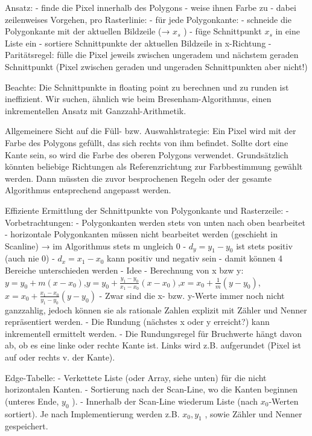 \documentclass[10pt,landscape]{article}
\makeatletter
\renewcommand{\subsection}{\@startsection{subsection}{2}{0mm}%
                                {-1explus -.5ex minus -.2ex}%
                                {0.5ex plus .2ex}%
                                {\normalfont\normalsize\bfseries}}
\makeatother
\begin{document}
\begin{multicols}{3}
Ansatz:
- finde die Pixel innerhalb des Polygons
- weise ihnen Farbe zu
- dabei zeilenweises Vorgehen, pro Rasterlinie:
- für jede Polygonkante:
  - schneide die Polygonkante mit der aktuellen Bildzeile (→ $x_s$ )
  - füge Schnittpunkt $x_s$ in eine Liste ein
- sortiere Schnittpunkte der aktuellen Bildzeile in x-Richtung
- Paritätsregel: fülle die Pixel jeweils zwischen ungeradem und nächstem geraden Schnittpunkt (Pixel zwischen geraden und ungeraden Schnittpunkten aber nicht!)

Beachte: Die Schnittpunkte in floating point zu berechnen und zu runden ist ineffizient. Wir suchen, ähnlich wie beim Bresenham-Algorithmus, einen inkrementellen Ansatz mit Ganzzahl-Arithmetik.

Allgemeinere Sicht auf die Füll- bzw. Auswahlstrategie: Ein Pixel wird mit der Farbe des Polygons gefüllt, das sich rechts von ihm befindet. Sollte dort eine Kante sein, so wird die Farbe des oberen Polygons verwendet. 
Grundsätzlich könnten beliebige Richtungen als Referenzrichtung zur Farbbestimmung gewählt werden. Dann müssten die zuvor besprochenen Regeln oder der gesamte Algorithmus entsprechend angepasst werden.

Effiziente Ermittlung der Schnittpunkte von Polygonkante und Rasterzeile:
- Vorbetrachtungen:
  - Polygonkanten werden stets von unten nach oben bearbeitet
  - horizontale Polygonkanten müssen nicht bearbeitet werden (geschieht in Scanline) → im Algorithmus stets m ungleich 0
  - $d_y = y_1 - y_0$ ist stets positiv (auch nie 0)
  - $d_x = x_1 - x_0$ kann positiv und negativ sein
  - damit können 4 Bereiche unterschieden werden
- Idee
  - Berechnung von x bzw y: $y=y_0+m(x-x_0)$,$y=y_0+\frac{y_1-y_0}{x_1-x_0}(x-x_0)$,$x=x_0+\frac{1}{m}(y-y_0)$, $x=x_0+\frac{x_1-x_0}{y_1-y_0}(y-y_0)$
  - Zwar sind die x- bzw. y-Werte immer noch nicht ganzzahlig, jedoch können sie als rationale Zahlen explizit mit Zähler und Nenner repräsentiert werden.
  - Die Rundung (nächstes x oder y erreicht?) kann inkrementell ermittelt werden.
  - Die Rundungsregel für Bruchwerte hängt davon ab, ob es eine linke oder rechte Kante ist. Links wird z.B. aufgerundet (Pixel ist auf oder rechts v. der Kante).


Edge-Tabelle:
- Verkettete Liste (oder Array, siehe unten) für die nicht horizontalen Kanten.
- Sortierung nach der Scan-Line, wo die Kanten beginnen (unteres Ende, $y_0$ ).
- Innerhalb der Scan-Line wiederum Liste (nach $x_0$-Werten sortiert). Je nach Implementierung werden z.B. $x_0 , y_1$ , sowie Zähler und Nenner gespeichert.


\end{multicols}
\end{document}
